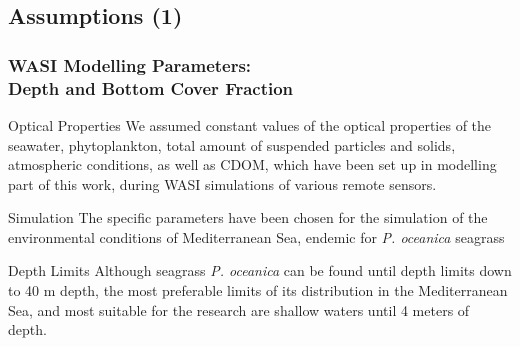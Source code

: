 \documentclass[pdflatex,compress,9pt,
	xcolor={dvipsnames,dvipsnames,svgnames,x11names,table},
	hyperref={colorlinks = true,breaklinks = true, urlcolor = NavyBlue, breaklinks = true}]{beamer}
\begin{document}
\subsection{Assumptions (1)}
\begin{frame}\frametitle{WASI Modelling Parameters: \\Depth and Bottom Cover Fraction}

\begin{alertblock}{Optical Properties}
We assumed constant values of the optical properties of the seawater, phytoplankton, total amount of suspended particles and solids, atmospheric conditions, as well as \ac{CDOM}, which have been set up in modelling part of this work, during WASI simulations of various remote sensors.
\end{alertblock}

\begin{block}{Simulation}
The specific parameters have been chosen for the simulation of the environmental conditions of Mediterranean Sea, endemic for \emph{P. oceanica} seagrass
\end{block}

\begin{examples}{Depth Limits}
Although seagrass \emph{P. oceanica} can be found until depth limits down to 40 m depth, the most preferable limits of its distribution in the Mediterranean Sea, and most suitable for the research are shallow waters until 4 meters of depth.
\end{examples}

\end{frame}
\end{document}
